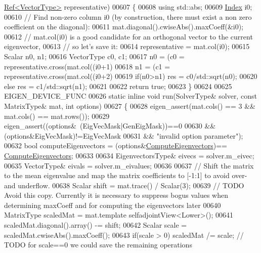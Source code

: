 \begin{DoxyCode}
      \hyperlink{group___core___module_class_eigen_1_1_ref}{Ref<VectorType>} representative)
00607   \{
00608     \textcolor{keyword}{using} std::abs;
00609     \hyperlink{namespace_eigen_a62e77e0933482dafde8fe197d9a2cfde}{Index} i0;
00610     \textcolor{comment}{// Find non-zero column i0 (by construction, there must exist a non zero coefficient on the diagonal):}
00611     mat.diagonal().cwiseAbs().maxCoeff(&i0);
00612     \textcolor{comment}{// mat.col(i0) is a good candidate for an orthogonal vector to the current eigenvector,}
00613     \textcolor{comment}{// so let's save it:}
00614     representative = mat.col(i0);
00615     Scalar n0, n1;
00616     VectorType c0, c1;
00617     n0 = (c0 = representative.cross(mat.col((i0+1)%
00618     n1 = (c1 = representative.cross(mat.col((i0+2)%
00619     \textcolor{keywordflow}{if}(n0>n1) res = c0/std::sqrt(n0);
00620     \textcolor{keywordflow}{else}      res = c1/std::sqrt(n1);
00621 
00622     \textcolor{keywordflow}{return} \textcolor{keyword}{true};
00623   \}
00624 
00625   EIGEN\_DEVICE\_FUNC
00626   \textcolor{keyword}{static} \textcolor{keyword}{inline} \textcolor{keywordtype}{void} run(SolverType& solver, \textcolor{keyword}{const} MatrixType& mat, \textcolor{keywordtype}{int} options)
00627   \{
00628     eigen\_assert(mat.cols() == 3 && mat.cols() == mat.rows());
00629     eigen\_assert((options&~(EigVecMask|GenEigMask))==0
00630             && (options&EigVecMask)!=EigVecMask
00631             && \textcolor{stringliteral}{"invalid option parameter"});
00632     \textcolor{keywordtype}{bool} computeEigenvectors = (options&\hyperlink{group__enums_ggae3e239fb70022eb8747994cf5d68b4a9ada93d8885bde32b876ba4af01d3292cc}{ComputeEigenvectors})==
      \hyperlink{group__enums_ggae3e239fb70022eb8747994cf5d68b4a9ada93d8885bde32b876ba4af01d3292cc}{ComputeEigenvectors};
00633     
00634     EigenvectorsType& eivecs = solver.m\_eivec;
00635     VectorType& eivals = solver.m\_eivalues;
00636   
00637     \textcolor{comment}{// Shift the matrix to the mean eigenvalue and map the matrix coefficients to [-1:1] to avoid over- and
       underflow.}
00638     Scalar shift = mat.trace() / Scalar(3);
00639     \textcolor{comment}{// TODO Avoid this copy. Currently it is necessary to suppress bogus values when determining maxCoeff
       and for computing the eigenvectors later}
00640     MatrixType scaledMat = mat.template selfadjointView<Lower>();
00641     scaledMat.diagonal().array() -= shift;
00642     Scalar scale = scaledMat.cwiseAbs().maxCoeff();
00643     \textcolor{keywordflow}{if}(scale > 0) scaledMat /= scale;   \textcolor{comment}{// TODO for scale==0 we could save the remaining operations}

\end{DoxyCode}
